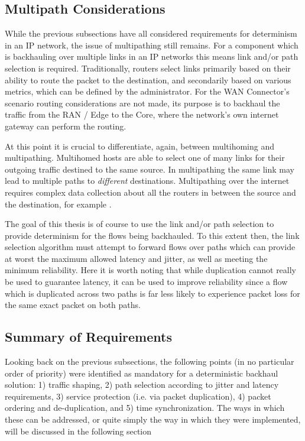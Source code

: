 \subsection{Multipath Considerations}

While the previous subsections have all considered requirements for determinism in an IP network, the issue of multipathing still remains. For a component which is backhauling over multiple links in an IP networks this means link and/or path selection is required. Traditionally, routers select links primarily based on their ability to route the packet to the destination, and secondarily based on various metrics, which can be defined by the administrator. For the WAN Connector's scenario routing considerations are not made, its purpose is to backhaul the traffic from the RAN / Edge to the Core, where the network's own internet gateway can perform the routing.

At this point it is crucial to differentiate, again, between multihoming and multipathing. Multihomed hosts are able to select one of many links for their outgoing traffic destined to the same source. In multipathing the same link may lead to multiple paths to \textit{different} destinations. Multipathing over the internet requires complex data collection about all the routers in between the source and the destination, for example \cite{multipath}. 

The goal of this thesis is of course to use the link and/or path selection to provide determinism for the flows being backhauled. To this extent then, the link selection algorithm must attempt to forward flows over paths which can provide at worst the maximum allowed latency and jitter, as well as meeting the minimum reliability. Here it is worth noting that while duplication cannot really be used to guarantee latency, it can be used to improve reliability since a flow which is duplicated across two paths is far less likely to experience packet loss for the same exact packet on both paths.

\subsection{Summary of Requirements}


Looking back on the previous subsections, the following points (in no particular order of priority) were identified as mandatory for a deterministic backhaul solution: 1) traffic shaping, 2) path selection according to jitter and latency requirements, 3) service protection (i.e. via packet duplication), 4) packet ordering and de-duplication, and 5) time synchronization. The ways in which these can be addressed, or quite simply the way in which they were implemented, will be discussed in the following section

